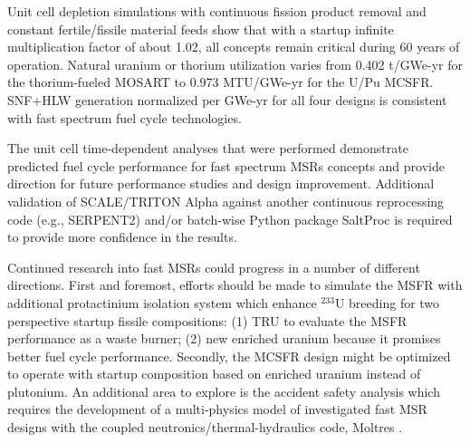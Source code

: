 \documentclass[letterpaper]{mandc2019}
\begin{document}
Unit cell depletion simulations with continuous fission product removal and constant fertile/fissile material feeds show that with a startup infinite multiplication factor of about 1.02, all concepts remain critical during 60 years of operation. 
Natural uranium or thorium utilization varies from 0.402 t/GWe-yr for the thorium-fueled \gls{MOSART} to 0.973 MTU/GWe-yr for the U/Pu \gls{MCSFR}. 
\gls{SNF}+\gls{HLW} generation normalized per GWe-yr for all four designs is consistent with fast spectrum fuel cycle technologies. %


The unit cell time-dependent analyses that were performed demonstrate predicted fuel cycle performance for fast spectrum \glspl{MSR} concepts and provide direction for future performance studies and design improvement. 
Additional validation of SCALE/TRITON Alpha against another continuous reprocessing code (e.g., SERPENT2) and/or batch-wise Python package SaltProc \cite{rykhlevskii_advanced_2018} is required to provide more confidence in the results.

Continued research into fast \glspl{MSR} could progress in a number of different directions. 
First and foremost, efforts should be made to simulate the \gls{MSFR} with additional protactinium isolation system which enhance $^{233}$U breeding for two perspective startup fissile compositions: (1) TRU to evaluate the \gls{MSFR} performance as a waste burner; (2) new enriched uranium because it promises better fuel cycle performance. 
Secondly, the \gls{MCSFR} design might be optimized to operate with startup composition based on enriched uranium instead of plutonium. 
An additional area to explore is the accident safety analysis which requires the development of a multi-physics model of investigated fast \gls{MSR} designs with the coupled neutronics/thermal-hydraulics code, Moltres \cite{lindsay_introduction_2018}. 
\end{document}
